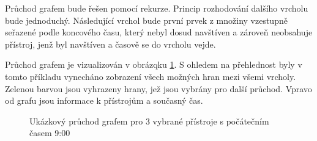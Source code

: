 Průchod grafem bude řešen pomocí rekurze. Princip rozhodování dalšího vrcholu bude jednoduchý. Následující vrchol bude první prvek z množiny vzestupně seřazené podle koncového času, který nebyl dosud navštíven a zároveň neobsahuje přístroj, jenž byl navštíven a časově se do vrcholu vejde.

Průchod grafem je vizualizován v obrázqku \ref{fig:graph_walk}. S ohledem na přehlednost byly v tomto příkladu vynecháno zobrazení všech možných hran mezi všemi vrcholy. Zelenou barvou jsou vyhrazeny hrany, jež jsou vybrány pro další průchod. Vpravo od grafu jsou informace k přístrojům a současný čas.

\begin{figure}
	\centering
	\vspace{3em} %
	\caption{Ukázkový průchod grafem pro 3 vybrané přístroje s počátečním časem 9:00}
	\label{fig:graph_walk}
\end{figure}
